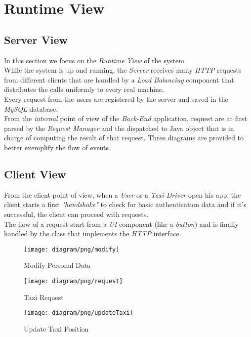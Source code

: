 \section{Runtime View} %
\label{sec:runtime_view}
\subsection{Server View} %
\label{sub:server_view}

In this section we focus on the \emph{Runtime View} of the system.\\
While the system is up and running, the \emph{Server} receives many \emph{HTTP} requests from different clients that are handled by a \emph{Load Balancing} component that distributes the calls uniformly to every real machine.\\
Every request from the users are registered by the server and saved in the \emph{MySQL} database.\\
From the \emph{internal} point of view of the \emph{Back-End} application, request are at first parsed by the \emph{Request Manager} and the dispatched to Java object that is in charge of computing the result of that request. Three diagrams are provided to better exemplify the flow of events.\\
\subsection{Client View} %
\label{sub:client_view}

From the client point of view, when a \emph{User} or a \emph{Taxi Driver} open his app, the client starts a first \emph{"handshake"} to check for basic authentication data and if it's successful, the client can proceed with requests.\\
The flow of a request start from a \emph{UI} component (like a \emph{button}) and is finally handled by the class that implements the \emph{HTTP} interface.


\newpage
\vfill
\begin{figure}[h!t]
\caption{Modify Personal Data}
\texttt{[image: diagram/png/modify]}
\centering
\end{figure}
\vfill
\clearpage

\newpage
\vfill
\begin{figure}[h!t]
\caption{Taxi Request}
\texttt{[image: diagram/png/request]}
\centering
\end{figure}
\vfill
\clearpage

\newpage
\vfill
\begin{figure}[h!t]
\caption{Update Taxi Position}
\texttt{[image: diagram/png/updateTaxi]}
\centering
\end{figure}
\vfill
\clearpage



